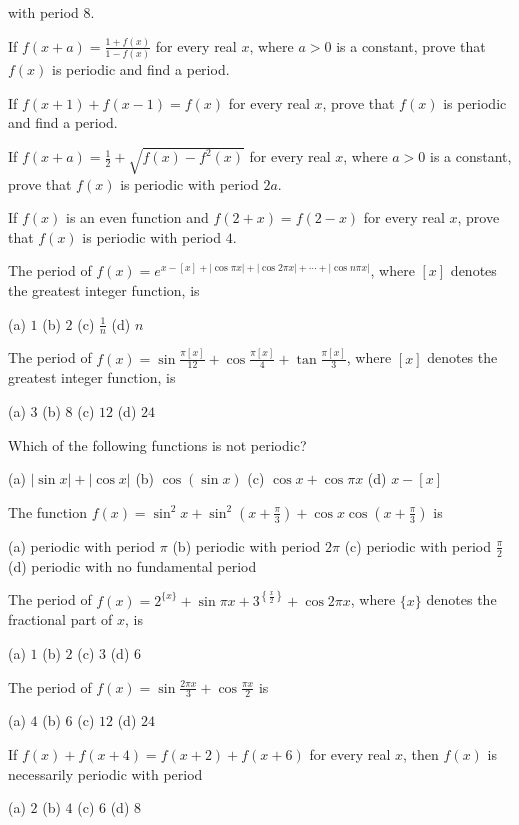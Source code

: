   with period $8$.
\item If $f(x + a) = \frac{1 + f(x)}{1 - f(x)}$ for every real $x$, where $a > 0$ is a constant,
  prove that $f(x)$ is periodic and find a period.
\item If $f(x + 1) + f(x - 1) = f(x)$ for every real $x$, prove that $f(x)$ is periodic and find a
  period.
\item If $f(x + a) = \frac{1}{2} + \sqrt{f(x) - f^2(x)}$ for every real $x$, where $a > 0$ is a
  constant, prove that $f(x)$ is periodic with period $2a$.
\item If $f(x)$ is an even function and $f(2 + x) = f(2 - x)$ for every real $x$, prove that
  $f(x)$ is periodic with period $4$.
\item The period of $f(x) = e^{x - [x] + |\cos\pi x| + |\cos2\pi x| + \cdots + |\cos n\pi x|}$,
  where $[x]$ denotes the greatest integer function, is

  (a) $1$ \quad (b) $2$ \quad (c) $\frac{1}{n}$ \quad (d) $n$
\item The period of $f(x) = \sin\frac{\pi[x]}{12} + \cos\frac{\pi[x]}{4} + \tan\frac{\pi[x]}{3}$,
  where $[x]$ denotes the greatest integer function, is

  (a) $3$ \quad (b) $8$ \quad (c) $12$ \quad (d) $24$
\item Which of the following functions is not periodic?

  (a) $|\sin x| + |\cos x|$ \quad (b) $\cos(\sin x)$ \quad (c) $\cos x + \cos\pi x$ \quad (d) $x - [x]$
\item The function $f(x) = \sin^2x + \sin^2\left(x + \frac{\pi}{3}\right) + \cos x\cos\left(x +
  \frac{\pi}{3}\right)$ is

  (a) periodic with period $\pi$ \quad (b) periodic with period $2\pi$ \quad (c) periodic with period
  $\frac{\pi}{2}$ \quad (d) periodic with no fundamental period
\item The period of $f(x) = 2^{\{x\}} + \sin\pi x + 3^{\left\{\frac{x}{2}\right\}} + \cos2\pi x$,
  where $\{x\}$ denotes the fractional part of $x$, is

  (a) $1$ \quad (b) $2$ \quad (c) $3$ \quad (d) $6$
\item The period of $f(x) = \sin\frac{2\pi x}{3} + \cos\frac{\pi x}{2}$ is

  (a) $4$ \quad (b) $6$ \quad (c) $12$ \quad (d) $24$
\item If $f(x) + f(x + 4) = f(x + 2) + f(x + 6)$ for every real $x$, then $f(x)$ is necessarily
  periodic with period

  (a) $2$ \quad (b) $4$ \quad (c) $6$ \quad (d) $8$
  \stopitemize
